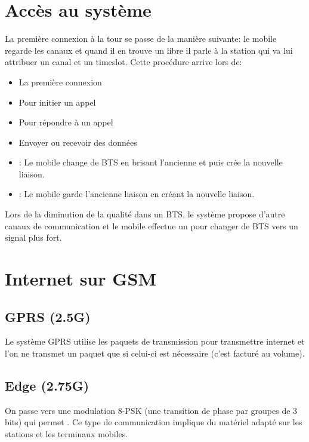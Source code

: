 \section{Accès au système}

La première connexion à la tour se passe de la manière suivante: le mobile regarde les canaux
et quand il en trouve un libre il parle à la station qui va lui attribuer un canal et un timeslot. Cette procédure arrive lors de:
\begin{itemize}
\item La première connexion
\item Pour initier un appel
\item Pour répondre à un appel
\item Envoyer ou recevoir des données
\end{itemize}

\begin{itemize}
\item {} : Le mobile change de BTS en brisant l'ancienne et puis crée la nouvelle liaison.
\item {} : Le mobile garde l'ancienne liaison en créant la nouvelle liaison.
\end{itemize}

Lors de la diminution de la qualité dans un BTS, le système propose d'autre canaux de communication et le mobile effectue un  pour changer de BTS vers un signal plus fort.

\newpage
\section{Internet sur GSM}

\subsection{GPRS (2.5G)}
Le système GPRS utilise les paquets de transmission pour transmettre internet et l'on ne transmet un paquet que si celui-ci est nécessaire (c'est facturé au volume).

\subsection{Edge (2.75G)}
On passe vers une modulation 8-PSK (une transition de phase par groupes de 3 bits) qui permet
. Ce type de communication implique du matériel adapté sur les stations et les terminaux mobiles.

